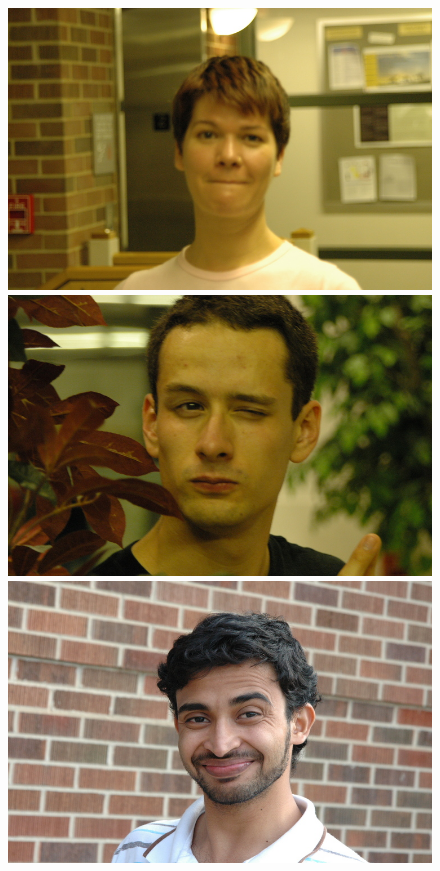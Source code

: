 \begin{figure}
\includegraphics[scale=0.35,clip=true]{figures_cvpr/examples/4/success/DSC_1922.JPG} 
\includegraphics[scale=0.35,clip=true]{figures_cvpr/examples/4/success/DSC_2000.JPG} \\
\includegraphics[scale=0.35,clip=true]{figures_cvpr/examples/4/failure/DSC_1568.JPG} 

\end{figure}
